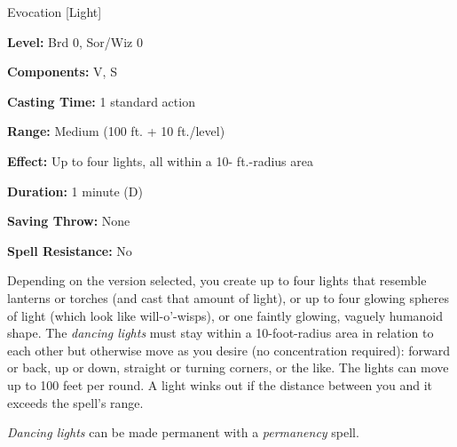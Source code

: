 
Evocation [Light]

\textbf{Level:} Brd 0, Sor/Wiz 0

\textbf{Components:} V, S

\textbf{Casting Time:} 1 standard action

\textbf{Range:} Medium (100 ft. + 10 ft./level)

\textbf{Effect:} Up to four lights, all within a 10- ft.-radius area

\textbf{Duration:} 1 minute (D)

\textbf{Saving Throw:} None

\textbf{Spell Resistance:} No

Depending on the version selected, you create up to four lights that resemble lanterns 
or torches (and cast that amount of light), or up to four glowing spheres of light 
(which look like will-o'-wisps), or one faintly glowing, vaguely humanoid shape. 
The \textit{dancing lights} must stay within a 10-foot-radius area in relation 
to each other but otherwise move as you desire (no concentration required): forward 
or back, up or down, straight or turning corners, or the like. The lights can move 
up to 100 feet per round. A light winks out if the distance between you and it 
exceeds the spell's range.

\textit{Dancing lights} can be made permanent with a \textit{permanency} spell.

